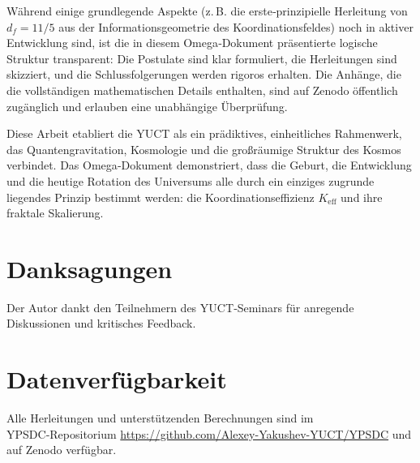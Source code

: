 \documentclass[11pt,a4paper]{article}
\begin{document}
	Während einige grundlegende Aspekte (z. B. die erste‑prinzipielle Herleitung von \(d_f = 11/5\) aus der Informationsgeometrie des Koordinationsfeldes) noch in aktiver Entwicklung sind, ist die in diesem Omega‑Dokument präsentierte logische Struktur transparent: Die Postulate sind klar formuliert, die Herleitungen sind skizziert, und die Schlussfolgerungen werden rigoros erhalten. Die Anhänge, die die vollständigen mathematischen Details enthalten, sind auf Zenodo öffentlich zugänglich und erlauben eine unabhängige Überprüfung.
	
	Diese Arbeit etabliert die YUCT als ein prädiktives, einheitliches Rahmenwerk, das Quantengravitation, Kosmologie und die großräumige Struktur des Kosmos verbindet. Das Omega‑Dokument demonstriert, dass die Geburt, die Entwicklung und die heutige Rotation des Universums alle durch ein einziges zugrunde liegendes Prinzip bestimmt werden: die Koordinationseffizienz \(K_{\mathrm{eff}}\) und ihre fraktale Skalierung.
	
	
	\section*{Danksagungen}
	
	Der Autor dankt den Teilnehmern des YUCT‑Seminars für anregende Diskussionen und kritisches Feedback.
	
	\section*{Datenverfügbarkeit}
	
	Alle Herleitungen und unterstützenden Berechnungen sind im YPSDC‑Repositorium \url{https://github.com/Alexey-Yakushev-YUCT/YPSDC} und auf Zenodo \cite{AppendixL,AppendixY,AppendixP,AppendixM,AppendixΩ,AppendixB} verfügbar.
	
\end{document}
